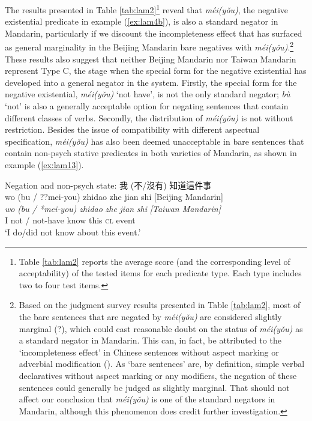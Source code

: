 \documentclass[output=paper]{langscibook}
\begin{document}
The results presented in Table \ref{tab:lam2}\footnote{Table \ref{tab:lam2} reports the average score (and the corresponding level of acceptability) of the tested items for each predicate type. Each type includes two to four test items.} reveal that \textit{méi(yǒu)}, the negative existential predicate in example (\ref{ex:lam4b}), is also a standard negator in Mandarin, particularly if we discount the incompleteness effect that has surfaced as general marginality in the Beijing Mandarin bare negatives with \textit{méi(yǒu)}.\footnote{Based on the judgment survey results presented in Table \ref{tab:lam2}, most of the bare sentences that are negated by \textit{méi(yǒu)} are considered slightly marginal (?), which could cast reasonable doubt on the status of \textit{méi(yǒu)} as a standard negator in Mandarin. This can, in fact, be attributed to the `incompleteness effect' in Chinese sentences without aspect marking or adverbial modification (\citealt{Tsai2008}).
As `bare sentences' are, by definition, simple verbal declaratives without aspect marking or any modifiers, the negation of these sentences could generally be judged as slightly marginal. That should not affect our conclusion that \textit{méi(yǒu)} is one of the standard negators in Mandarin, although this phenomenon does credit further investigation.} 
These results also suggest that neither Beijing Mandarin nor Taiwan Mandarin represent Type C, the stage when the special form for the negative existential has developed into a general negator in the system. Firstly, the special form for the negative existential, \textit{méi(yǒu)} `not have', is not the only standard negator; \textit{bù} `not' is also a generally acceptable option for negating sentences that contain different classes of verbs. Secondly, the distribution of \textit{méi(yǒu)} is not without restriction. Besides the issue of compatibility with different aspectual specification, \textit{méi(yǒu)} has also been deemed unacceptable in bare sentences that contain non-psych stative predicates in both varieties of Mandarin, as shown in example (\ref{ex:lam13}). 

\ea Negation and non-psych state: 我 (不/沒有) 知道這件事 \label{ex:lam13}\\
  \glll wo {(bu / ??mei-you)} zhidao zhe jian shi {[Beijing Mandarin]}\\
  \textit{wo} \textit{(bu / *mei-you)} \textit{zhidao} \textit{zhe} \textit{jian} \textit{shi} \textit{[Taiwan Mandarin]}\\
  I {not / not-have} know this \textsc{cl} event\\
  \glt `I do/did not know about this event.' 
\z 
\end{document}
